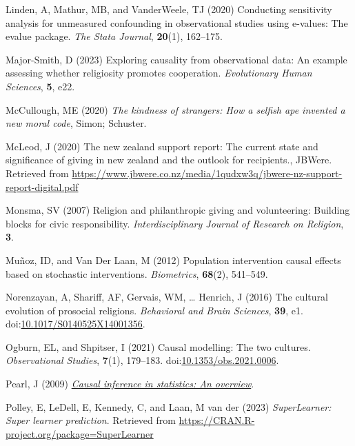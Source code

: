 \documentclass[
  single column]{article}
\newlength{\cslhangindent}
\newenvironment{CSLReferences}[2] %
 {\begin{list}{}{%
  \setlength{\itemindent}{0pt}
  \setlength{\leftmargin}{0pt}
  \setlength{\parsep}{0pt}
  \ifodd #1
   \setlength{\leftmargin}{\cslhangindent}
   \setlength{\itemindent}{-1\cslhangindent}
  \fi
  \setlength{\itemsep}{#2\baselineskip}}}
 {\end{list}}
\begin{document}
\begin{CSLReferences}{1}{0}
Linden, A, Mathur, MB, and VanderWeele, TJ (2020) Conducting sensitivity
analysis for unmeasured confounding in observational studies using
e-values: The evalue package. \emph{The Stata Journal}, \textbf{20}(1),
162--175.

Major-Smith, D (2023) Exploring causality from observational data: An
example assessing whether religiosity promotes cooperation.
\emph{Evolutionary Human Sciences}, \textbf{5}, e22.

McCullough, ME (2020) \emph{The kindness of strangers: How a selfish ape
invented a new moral code}, Simon; Schuster.

McLeod, J (2020) The new zealand support report: The current state and
significance of giving in new zealand and the outlook for recipients.,
JBWere. Retrieved from
\url{https://www.jbwere.co.nz/media/1qudxw3q/jbwere-nz-support-report-digital.pdf}

Monsma, SV (2007) Religion and philanthropic giving and volunteering:
Building blocks for civic responsibility. \emph{Interdisciplinary
Journal of Research on Religion}, \textbf{3}.

Muñoz, ID, and Van Der Laan, M (2012) Population intervention causal
effects based on stochastic interventions. \emph{Biometrics},
\textbf{68}(2), 541--549.

Norenzayan, A, Shariff, AF, Gervais, WM, \ldots{} Henrich, J (2016) The
cultural evolution of prosocial religions. \emph{Behavioral and Brain
Sciences}, \textbf{39}, e1.
doi:\href{https://doi.org/10.1017/S0140525X14001356}{10.1017/S0140525X14001356}.

Ogburn, EL, and Shpitser, I (2021) Causal modelling: The two cultures.
\emph{Observational Studies}, \textbf{7}(1), 179--183.
doi:\href{https://doi.org/10.1353/obs.2021.0006}{10.1353/obs.2021.0006}.

Pearl, J (2009) \emph{\href{https://doi.org/10.1214/09-SS057}{Causal
inference in statistics: An overview}}.

Polley, E, LeDell, E, Kennedy, C, and Laan, M van der (2023)
\emph{SuperLearner: Super learner prediction}. Retrieved from
\url{https://CRAN.R-project.org/package=SuperLearner}


\end{CSLReferences}
\end{document}
